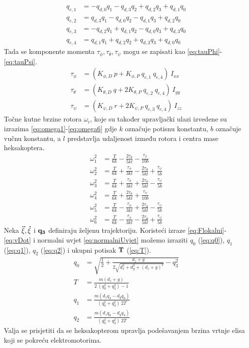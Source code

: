 \documentclass[times, utf8, diplomski]{fer}
\begin{document}
\begin{align}
q_{e,1} &= -q_{d,0}q_1 -q_{d,3}q_2 + q_{d,2}q_3 + q_{d,1}q_0 \label{eq:PIDqe1} \\
q_{e,2} &= q_{d,3}q_1 -q_{d,0}q_2 - q_{d,1}q_3 + q_{d,2}q_0 \label{eq:PIDqe2} \\
q_{e,3} &= -q_{d,2}q_1 +q_{d,1}q_2 - q_{d,0}q_3 + q_{d,3}q_0 \label{eq:PIDqe3} \\
q_{e,4} &= q_{d,1}q_1 +q_{d,2}q_2 + q_{d,3}q_3 + q_{d,0}q_0 \label{eq:PIDqe4}
\end{align}
Tada se komponente momenta $\tau_{\phi}, \tau_{\theta},\tau_{\psi}$ mogu se zapisati kao \ref{eq:tauPhi}-\ref{eq:tauPsi}.
\begin{align}
\tau_{\phi} &= (K_{\phi,D}~p + K_{\phi,P}~q_{e,1}~q_{e,4})~I_{xx} \label{eq:tauPhi} \\
\tau_{\theta} &= (K_{\theta,D}~q + 2K_{\theta,P}~q_{e,2}~q_{e,4})~I_{yy} \label{eq:tauTheta} \\
\tau_{\psi} &= (K_{\psi,D}~r + 2K_{\psi,P}~q_{e,3}~q_{e,4})~I_{zz} \label{eq:tauPsi}
\end{align}
Točne kutne brzine rotora $\omega_i$, koje su također upravljački ulazi izvedene su izrazima \ref{eq:omega1}-\ref{eq:omega6} gdje $k$ označuje potisnu konstantu, $b$ označuje vučnu konstantu, a $l$ predstavlja udaljenost između rotora i centra mase heksakoptera.
\begin{align}
\omega^2_1 &= \frac{T}{6k} - \frac{2\tau_{\theta}}{5kl} - \frac{\tau_{\psi}}{10b} \label{eq:omega1} \\
\omega^2_2 &= \frac{T}{6k} + \frac{\tau_{\phi}}{3kl} -\frac{2\tau_{\theta}}{5kl} + \frac{\tau_{\psi}}{5b} \label{eq:omega2} \\
\omega^2_3 &= \frac{T}{6k} + \frac{\tau_{\phi}}{3kl} + \frac{2\tau_{\theta}}{5kl} - \frac{\tau_{\psi}}{5b} \label{eq:omega3} \\
\omega^2_4 &= \frac{T}{6k} + \frac{2\tau_{\theta}}{5kl} + \frac{\tau_{\psi}}{10b} \label{eq:omega4} \\
\omega^2_5 &= \frac{T}{6k} - \frac{\tau_{\phi}}{3kl} + \frac{2\tau_{\theta}}{5kl} - \frac{\tau_{\psi}}{5b} \label{eq:omega5} \\
\omega^2_6 &= \frac{T}{6k} - \frac{\tau_{\phi}}{3kl} -\frac{2\tau_{\theta}}{5kl} + \frac{\tau_{\psi}}{5b} \label{eq:omega6} 
\end{align}
Neka $\bf \ddot{\xi}, \dot{\xi}$ i $\bf q_3$ definiraju željenu trajektoriju. Koristeći izraze \ref{eq:Flokalni}-\ref{eq:vDot} i normalni uvjet \ref{eq:normalniUvjet} možemo izraziti $q_0$ (\ref{eq:q0}), $q_1$ (\ref{eq:q1}), $q_2$ (\ref{eq:q2}) i ukupni potisak $\bf T$ (\ref{eq:T}). 
\begin{align}
q_0 &= \sqrt{\frac{1}{2} + \frac{d_z+g}{2\sqrt{d^2_x+d^2_y+(d_z+g)^2}}-q^2_3} \label{eq:q0} \\
T &= \frac{m(d_z + g)}{2~(q^2_0 + q^2_3)-1} \label{eq:T} \\
q_1 &= \frac{m(d_z q_3 - d_y q_0)}{(q^2_0 + q^2_3)~2T} \label{eq:q1} \\
q_2 &= \frac{m(d_z q_0 - d_y q_3)}{(q^2_0 + q^2_3)~2T} \label{eq:q2}
\end{align}
Valja se prisjetiti da se heksakopterom upravlja podešavanjem brzina vrtnje elisa koji se pokreću elektromotorima. 
\end{document}
